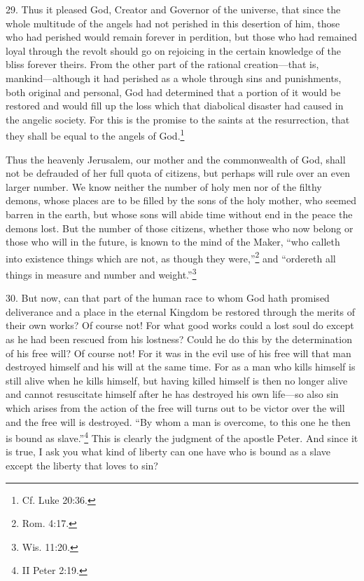 29. Thus it pleased God, Creator and Governor of the universe, that since the whole multitude of the angels had not perished in this desertion of him, those who had perished would remain forever in perdition, but those who had remained loyal through the revolt should go on rejoicing in the certain knowledge of the bliss forever theirs. From the other part of the rational creation—that is, mankind—although it had perished as a whole through sins and punishments, both original and personal, God had determined that a portion of it would be restored and would fill up the loss which that diabolical disaster had caused in the angelic society. For this is the promise to the saints at the resurrection, that they shall be equal to the angels of God.\footnote{Cf. Luke 20:36.}

Thus the heavenly Jerusalem, our mother and the commonwealth of God, shall not be defrauded of her full quota of citizens, but perhaps will rule over an even larger number. We know neither the number of holy men nor of the filthy demons, whose places are to be filled by the sons of the holy mother, who seemed barren in the earth, but whose sons will abide time without end in the peace the demons lost. But the number of those citizens, whether those who now belong or those who will in the future, is known to the mind of the Maker, ``who calleth into existence things which are not, as though they were,''\footnote{Rom. 4:17.} and ``ordereth all things in measure and number and weight.''\footnote{Wis. 11:20.}

30. But now, can that part of the human race to whom God hath promised deliverance and a place in the eternal Kingdom be restored through the merits of their own works? Of course not! For what good works could a lost soul do except as he had been rescued from his lostness? Could he do this by the determination of his free will? Of course not! For it was in the evil use of his free will that man destroyed himself and his will at the same time. For as a man who kills himself is still alive when he kills himself, but having killed himself is then no longer alive and cannot resuscitate himself after he has destroyed his own life—so also sin which arises from the action of the free will turns out to be victor over the will and the free will is destroyed. ``By whom a man is overcome, to this one he then is bound as slave.''\footnote{II Peter 2:19.} This is clearly the judgment of the apostle Peter. And since it is true, I ask you what kind of liberty can one have who is bound as a slave except the liberty that loves to sin?

